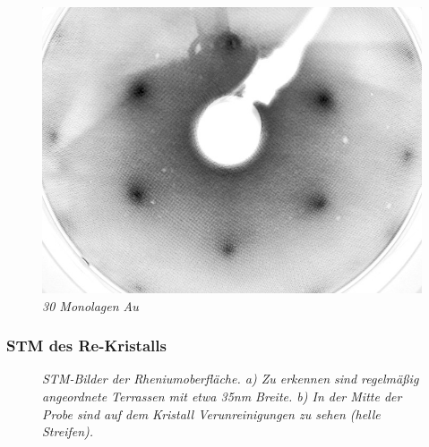 \documentclass{beamer}
\begin{document}
\begin{frame}
\begin{minipage}{\linewidth}
\begin{figure}[H]
\begin{minipage}[b]{0.3\textwidth}
		\includegraphics[width=\textwidth]{bilder/30ML_E208}
		\caption*{\textit{30 Monolagen Au}}
	\end{minipage}
\end{figure}
\end{minipage}
\end{frame}

\begin{frame}
\frametitle{STM des Re-Kristalls}
\begin{figure}[htbp]
	\vspace{-0.5cm}
	\begin{minipage}[b]{0.45\textwidth} 
		\sffamily
		
	\end{minipage}
	\hspace{0.5cm}
	\begin{minipage}[b]{0.45\textwidth}
		\sffamily
		
	\end{minipage}
	\caption{\textit{STM-Bilder der Rheniumoberfläche. a) Zu erkennen sind regelmäßig angeordnete
	Terrassen mit etwa 35nm Breite. b) In der Mitte der Probe sind auf dem Kristall Verunreinigungen zu
	sehen (helle Streifen).}}
	\end{figure}
\end{frame}
\end{document}
